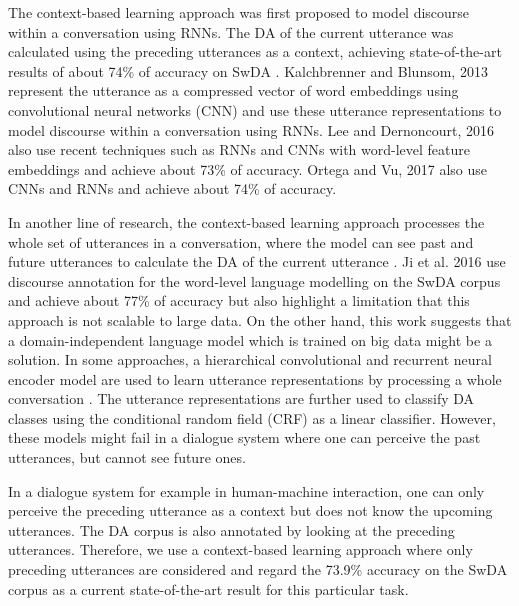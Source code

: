 \documentclass[a4paper]{article}
\begin{document}
The context-based learning approach was first proposed to model discourse within a conversation using RNNs. The DA of the current utterance was calculated using the preceding utterances as a context, achieving state-of-the-art results of about 74\% of accuracy on SwDA \cite{kalchbrenner2013recurrent,ortega2017neural}. Kalchbrenner and Blunsom, 2013 \cite{kalchbrenner2013recurrent} represent the utterance as a compressed vector of word embeddings using convolutional neural networks (CNN) and use these utterance representations to model discourse within a conversation using RNNs. 
Lee and Dernoncourt, 2016 \cite{lee2016sequential} also use recent techniques such as RNNs and CNNs with word-level feature embeddings and achieve about 73\% of accuracy. Ortega and Vu, 2017 \cite{ortega2017neural} also use CNNs and RNNs and achieve about 74\% of accuracy.

In another line of research, the context-based learning approach processes the whole set of utterances in a conversation, where the model can see past and future utterances to calculate the DA of the current utterance \cite{ji2016latent,kumar2017dasl}. 
Ji et al. 2016 \cite{ji2016latent} use discourse annotation for the word-level language modelling on the SwDA corpus and achieve about 77\% of accuracy but also highlight a limitation that this approach is not scalable to large data.
On the other hand, this work suggests that a domain-independent language model which is trained on big data might be a solution.
In some approaches, a hierarchical convolutional and recurrent neural encoder model are used to learn utterance representations by processing a whole conversation \cite{kumar2017dasl,ltAl2017EMNLP}.
The utterance representations are further used to classify DA classes using the conditional random field (CRF) as a linear classifier.
However, these models might fail in a dialogue system where one can perceive the past utterances, but cannot see future ones. 

In a dialogue system for example in human-machine interaction, one can only perceive the preceding utterance as a context but does not know the upcoming utterances.
The DA corpus is also annotated by looking at the preceding utterances.
Therefore, we use a context-based learning approach where only preceding utterances are considered and regard the 73.9\% accuracy \cite{kalchbrenner2013recurrent,ortega2017neural} on the SwDA corpus as a current state-of-the-art result for this particular task.
\end{document}
